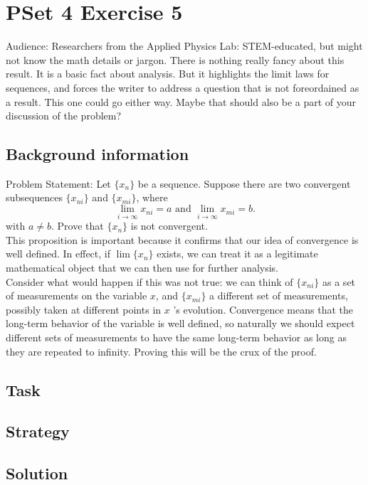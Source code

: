 \documentclass[11 pt]{article}
\begin{document}
\section{PSet 4 Exercise 5}
Audience: Researchers from the Applied Physics Lab: STEM-educated, but might not know the math details or jargon.
There is nothing really fancy about this result. It is a basic fact about analysis. But it highlights the limit laws for sequences, and forces the writer to address a question that is not foreordained as a result. This one could go either way. Maybe that should also be a part of your
discussion of the problem?
\begin{multicols*}{2}
\subsection{Background information}
Problem Statement: Let $\{x_n\}$ be a sequence. Suppose there are two convergent subsequences $\{x_{ni}\}$ and $\{x_{mi}\}$, where \[
\lim_{i\to\infty}x_{ni}=a \text{ and } \lim_{i\to\infty}x_{mi}=b
.\] 
with $a\neq b$. Prove that  $\{x_n\}$ is not convergent.\\
This proposition is important because it confirms that our idea of convergence is well defined. In effect, if $\lim\{x_n\}$ exists, we can treat it as a legitimate mathematical object that we can then use for further analysis.\\
Consider what would happen if this was not true: we can think of $\{x_{ni}\}$ as a set of measurements on the variable $x$, and  $\{x_{mi}\}$ a different set of measurements, possibly taken at different points in $x$ 's evolution. Convergence means that the long-term behavior of the variable is well defined, so naturally we should expect different sets of measurements to have the same long-term behavior as long as they are repeated to infinity. Proving this will be the crux of the proof.
\subsection{Task}
\subsection{Strategy}
\columnbreak
\subsection{Solution}
\end{multicols*}
\pagebreak
\end{document}
